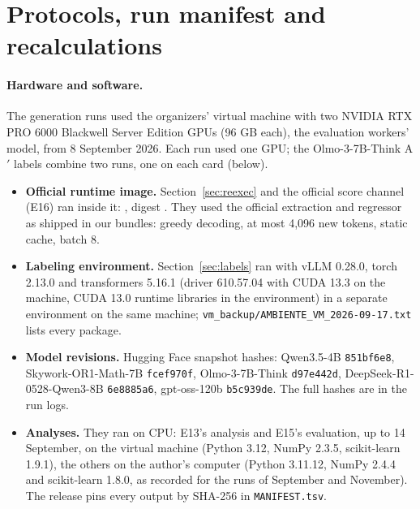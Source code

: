 \section{Protocols, run manifest and recalculations}\label{app:C}

\paragraph{Hardware and software.} The generation runs used the organizers' virtual machine with two NVIDIA RTX PRO 6000 Blackwell Server Edition GPUs (96 GB each), the evaluation workers' model, from 8 September 2026. Each run used one GPU; the Olmo-3-7B-Think A$'$ labels combine two runs, one on each card (below).
\begin{itemize}
\item \textbf{Official runtime image.} Section~\ref{sec:reexec} and the official score channel (E16) ran inside it: {\footnotesize{}}, digest {\footnotesize{}}. They used the official extraction and regressor as shipped in our bundles: greedy decoding, at most 4,096 new tokens, static cache, batch 8.
\item \textbf{Labeling environment.} Section~\ref{sec:labels} ran with vLLM 0.28.0, torch 2.13.0 and transformers 5.16.1 (driver 610.57.04 with CUDA 13.3 on the machine, CUDA 13.0 runtime libraries in the environment) in a separate environment on the same machine; \texttt{vm\_backup/AMBIENTE\_VM\_2026-09-17.txt} lists every package.
\item \textbf{Model revisions.} Hugging Face snapshot hashes: Qwen3.5-4B \texttt{851bf6e8}, Skywork-OR1-Math-7B \texttt{fcef970f}, Olmo-3-7B-Think \texttt{d97e442d}, DeepSeek-R1-0528-Qwen3-8B \texttt{6e8885a6}, gpt-oss-120b \texttt{b5c939de}. The full hashes are in the run logs.
\item \textbf{Analyses.} They ran on CPU: E13's analysis and E15's evaluation, up to 14 September, on the virtual machine (Python 3.12, NumPy 2.3.5, scikit-learn 1.9.1), the others on the author's computer (Python 3.11.12, NumPy 2.4.4 and scikit-learn 1.8.0, as recorded for the runs of September and November). The release pins every output by SHA-256 in \texttt{MANIFEST.tsv}.
\end{itemize}

